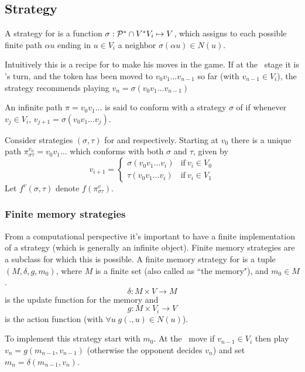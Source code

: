 \subsection{Strategy}
A strategy for  is a function $\sigma : \mathcal{P}^{*} \cap V^*V_{i} \mapsto V$, which assigns to each possible finite path $\alpha u$ ending in $ u \in V_i$ a neighbor $\sigma(\alpha u) \in N(u)$.

Intuitively this is a recipe for  to make his moves in the game. If at the \nth\ stage it is 's turn, and the token has been moved to $v_0v_1 \ldots v_{n-1}$ so far (with $v_{n-1} \in V_i$), the strategy recommends playing $v_n=\sigma(v_0v_1 \ldots v_{n-1})$

An infinite path $\pi= v_0 v_1 \ldots$ is said to conform with a strategy $\sigma$ of  if whenever $v_j \in V_i$, $v_{j+1}=\sigma(v_0 v_1 \ldots v_j)$.

Consider strategies $(\sigma,\tau)$ for  and  respectively. Starting at $v_0$ there is a unique path $\pi^{v_0}_{\sigma\tau}= v_0 v_1 \ldots $ which conforms with both $\sigma$ and $\tau$, given by
\begin{equation*}
v_{i+1} = \begin{cases}
\sigma(v_0v_1\ldots v_i) & \text{if}\  v_i \in V_0\\
\tau(v_0v_1\ldots v_i) & \text{if}\  v_i \in V_1
\end{cases}
\end{equation*}
Let $f^{v}(\sigma,\tau)$ denote $f(\pi^v_{\sigma\tau})$.

\subsubsection{Finite memory strategies}
From a computational perspective it's important to have a finite implementation of a strategy (which is generally an infinite object). Finite memory strategies are a subclass for which this is possible. A finite memory strategy for  is a tuple $(M,\delta,g,m_0)$, where $M$ is a finite set (also called as ``the memory"), and $m_0 \in M$. 
\[
    \delta : M \times V \to M
\]
is the update function for the memory and
\[
    g : M \times V_i \to V
\]
is the action function (with $\forall u \; g(.,u) \in N(u)$).

To implement this strategy start with $m_0$. At the \nth\ move if $v_{n-1} \in V_i$ then play $v_n=g(m_{n-1},v_{n-1})$ (otherwise the opponent decides $v_n$) and set $m_n = \delta(m_{n-1},v_n)$.

